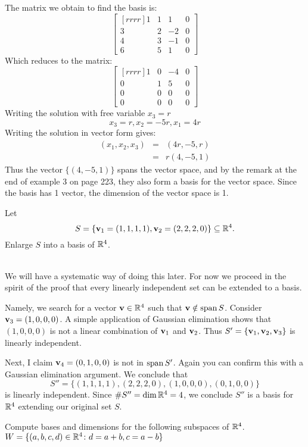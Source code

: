 \begin{solution}
\noindent The matrix we obtain to find the basis is:
$$
\begin{bmatrix}[rrrr]
1&1&1&0\\
3&2&-2&0\\
4&3&-1&0\\
6&5&1&0
\end{bmatrix}
$$
Which reduces to the matrix:
$$
\begin{bmatrix}[rrrr]
1&0&-4&0\\
0&1&5&0\\
0&0&0&0\\
0&0&0&0
\end{bmatrix}
$$
Writing the solution with free variable $x_3 = r$
$$
x_3 = r, x_2 = -5r, x_1 = 4r
$$
Writing the solution in vector form gives:
\begin{eqnarray*}
(x_1,x_2,x_3) &=& (4r,-5,r)\\
&=& r(4,-5,1)
\end{eqnarray*}
Thus the vector $\{(4,-5,1)\}$ spans the vector space, and by the remark at the end of example 3 on page 223, they also form a basis for the vector space. Since the basis has 1 vector, the dimension of the vector space is 1.
\end{solution}
\ii Let 
\[
S=\{{\mathbf v}_1=(1,1,1,1), {\mathbf v}_2=(2,2,2,0) \}\subseteq{\mathbb R}^4.
\]
Enlarge $S$ into a basis of ${\mathbb R}^4$. 
\\
\begin{solution}
\ \\
We will have a systematic way of doing this later. For now we proceed in the spirit of the proof that every linearly independent set can be extended to a basis. 

Namely, we search for a vector ${\mathbf v}\in {\mathbb R}^4$ such that ${\mathbf v}\notin\operatorname{span} S$. Consider ${\mathbf v}_3=(1,0,0,0)$. A simple application of Gaussian elimination shows that $(1,0,0,0)$ is not a linear combination of ${\mathbf v}_1$ and ${\mathbf v}_2$. Thus $S'=\{{\mathbf v}_1,{\mathbf v}_2,{\mathbf v}_3\}$ is linearly independent. 

Next, I claim ${\mathbf v}_4=(0,1,0,0)$ is not in $\operatorname{span} S'$. Again you can confirm this with a Gaussian elimination argument. We conclude that 
\[
S''=\{(1,1,1,1), (2,2,2,0),(1,0,0,0), (0,1,0,0)\}
\]
is linearly independent. Since $\#S''=\dim{\mathbb R}^4=4$, we conclude $S''$ is a basis for ${\mathbb R}^4$ extending our original set $S$. 
\end{solution}
\ii Compute bases and dimensions for the following subspaces of ${\mathbb R}^4$.
\bb
\ii $W=\{(a,b,c,d)\in{\mathbb R}^4\colon d=a+b, c=a-b\}$
